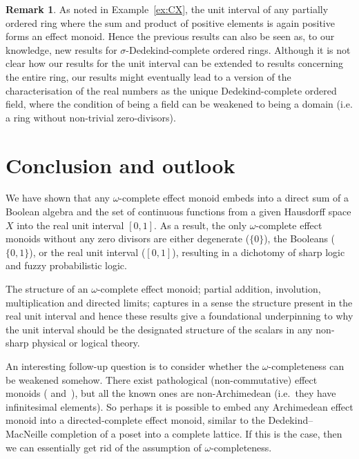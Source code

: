 \documentclass[10pt,conference]{IEEEtran}
\newcounter{counter}
\theoremstyle{definition}
\newtheorem{remark}[counter]{Remark}
\begin{document}
\begin{remark}
    As noted in Example~\ref{ex:CX}, the unit interval of any partially ordered ring where the sum and product of positive elements is again positive forms an effect monoid. Hence the previous results can also be seen as, to our knowledge, new results for $\sigma$-Dedekind-complete ordered rings. Although it is not clear how our results for the unit interval can be extended to results concerning the entire ring, our results might eventually lead to a version of the characterisation of the real numbers as the unique Dedekind-complete ordered field, where the condition of being a field can be weakened to being a domain (i.e. a ring without non-trivial zero-divisors).
\end{remark}


\section{Conclusion and outlook}\label{sec:conclusion}
We have shown that any $\omega$-complete effect monoid 
	embeds into a direct sum of a Boolean algebra and 
	the set of continuous functions from a given 
	Hausdorff space $X$ into the real unit interval $[0,1]$. 
As a result, the only $\omega$-complete effect monoids 
	without any zero divisors are either degenerate ($\{0\}$), 
	the Booleans ($\{0,1\}$), or the real unit interval ($[0,1]$),
	resulting in a dichotomy of sharp logic 
	and fuzzy probabilistic logic. 

The structure of an $\omega$-complete effect monoid; 
	partial addition, involution, multiplication 
	and directed limits; 
	captures in a sense the structure present 
	in the real unit interval and hence these results 
	give a foundational underpinning to why 
	the unit interval should be the designated structure 
	of the scalars in any non-sharp physical or logical theory.

An interesting follow-up question is to consider whether the $\omega$-completeness can be weakened somehow. There exist pathological (non-commutative)
    effect monoids
    (\cite[Ex.~4.3.9]{kentathesis} and~\cite[Cor.~51]{basmaster}), but all the known ones
    are non-Archimedean (i.e.~they have infinitesimal elements).
    So perhaps it is possible to embed any Archimedean effect monoid
    into a directed-complete effect monoid, similar
    to the Dedekind--MacNeille completion of a poset into a
    complete lattice.
    If this is the case, then we can essentially get rid of the assumption of $\omega$-completeness.
\end{document}
